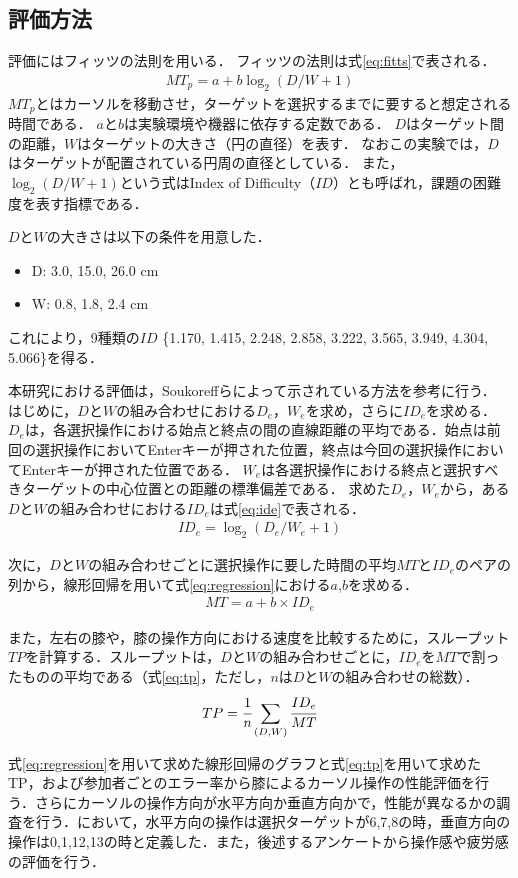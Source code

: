 \documentclass[submit, techrep]{ipsj}
\begin{document}
\subsection{評価方法}
評価にはフィッツの法則\cite{fitts}を用いる．
フィッツの法則は式\ref{eq:fitts}で表される．
\begin{eqnarray}
	MT_p = a + b\log_2{(D/W + 1)}
	\label{eq:fitts}
\end{eqnarray}
$MT_p$とはカーソルを移動させ，ターゲットを選択するまでに要すると想定される時間である．
$a$と$b$は実験環境や機器に依存する定数である．
$D$はターゲット間の距離，$W$はターゲットの大きさ（円の直径）を表す．
なおこの実験では，$D$はターゲットが配置されている円周の直径としている．
また，$\log_2{(D/W + 1)}$という式はIndex of Difficulty（$ID$）とも呼ばれ，課題の困難度を表す指標である．\par
$D$と$W$の大きさは以下の条件を用意した．
\begin{itemize}
	\item {D: } 3.0, 15.0, 26.0 \si{cm}
	\item {W: } 0.8, 1.8, 2.4 \si{cm}
\end{itemize}
これにより，9種類の$ID$ \{1.170, 1.415, 2.248, 2.858, 3.222, 3.565, 3.949, 4.304, 5.066\}を得る．\par
本研究における評価は，Soukoreffら\cite{Soukoreff:2004:TSP:1056153.1056155}によって示されている方法を参考に行う．
はじめに，$D$と$W$の組み合わせにおける$D_e$，$W_e$を求め，さらに$ID_e$を求める．
$D_e$は，各選択操作における始点と終点の間の直線距離の平均である．始点は前回の選択操作においてEnterキーが押された位置，終点は今回の選択操作においてEnterキーが押された位置である．
$W_e$は各選択操作における終点と選択すべきターゲットの中心位置との距離の標準偏差である．
求めた$D_e$，$W_e$から，ある$D$と$W$の組み合わせにおける$ID_e$は式\ref{eq:ide}で表される．
\begin{eqnarray}
	ID_e = \log_2{(D_e/W_e + 1)}
	\label{eq:ide}
\end{eqnarray}
\par
次に，$D$と$W$の組み合わせごとに選択操作に要した時間の平均$MT$と$ID_e$のペアの列から，線形回帰を用いて式\ref{eq:regression}における$a$,$b$を求める．
\begin{eqnarray}
	MT = a + b \times  ID_e
	\label{eq:regression}
\end{eqnarray}
\par
また，左右の膝や，膝の操作方向における速度を比較するために，スループット$TP$を計算する．スループットは，$D$と$W$の組み合わせごとに，$ID_e$を$MT$で割ったものの平均である（式\ref{eq:tp}，ただし，$n$は$D$と$W$の組み合わせの総数）．
\begin{eqnarray}
	TP = \cfrac{1}{n} \sum_{(D,W)} \cfrac{ID_e}{MT}
	\label{eq:tp}
\end{eqnarray}
\par
式\ref{eq:regression}を用いて求めた線形回帰のグラフと式\ref{eq:tp}を用いて求めたTP，および参加者ごとのエラー率から膝によるカーソル操作の性能評価を行う．さらにカーソルの操作方向が水平方向か垂直方向かで，性能が異なるかの調査を行う．において，水平方向の操作は選択ターゲットが6,7,8の時，垂直方向の操作は0,1,12,13の時と定義した．また，後述するアンケートから操作感や疲労感の評価を行う．
\end{document}
